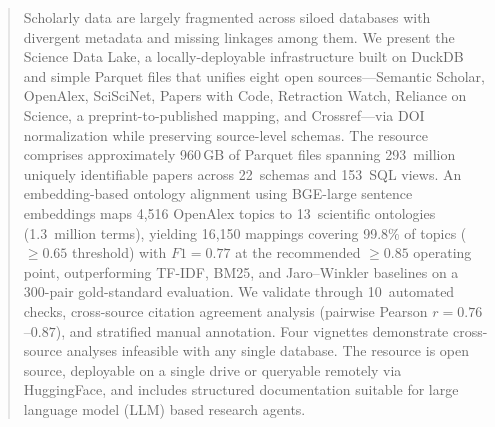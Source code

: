 \begin{abstract}
Scholarly data are largely fragmented across siloed databases with divergent metadata and missing linkages among them. We present the Science Data Lake, a locally-deployable infrastructure built on DuckDB and simple Parquet files that unifies eight open sources---Semantic Scholar, OpenAlex, SciSciNet, Papers with Code, Retraction Watch, Reliance on Science, a preprint-to-published mapping, and Crossref---via DOI normalization while preserving source-level schemas. The resource comprises approximately 960\,GB of Parquet files spanning 293~million uniquely identifiable papers across 22~schemas and 153~SQL views. An embedding-based ontology alignment using BGE-large sentence embeddings maps 4,516 OpenAlex topics to 13~scientific ontologies (1.3~million terms), yielding 16,150 mappings covering 99.8\% of topics ($\geq 0.65$ threshold) with $F1 = 0.77$ at the recommended $\geq 0.85$ operating point, outperforming TF-IDF, BM25, and Jaro--Winkler baselines on a 300-pair gold-standard evaluation. We validate through 10~automated checks, cross-source citation agreement analysis (pairwise Pearson $r = 0.76$--$0.87$), and stratified manual annotation. Four vignettes demonstrate cross-source analyses infeasible with any single database. The resource is open source, deployable on a single drive or queryable remotely via HuggingFace, and includes structured documentation suitable for large language model (LLM) based research agents.
\end{abstract}
